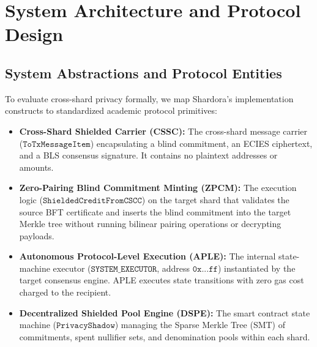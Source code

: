 \documentclass[journal,10pt,twocolumn]{IEEEtran}
\theoremstyle{definition}
\theoremstyle{remark}
\begin{document}
\section{System Architecture and Protocol Design}

\subsection{System Abstractions and Protocol Entities}
To evaluate cross-shard privacy formally, we map Shardora's implementation constructs to standardized academic protocol primitives:
\begin{itemize}[leftmargin=*]
    \item \textbf{Cross-Shard Shielded Carrier (CSSC):} The cross-shard message carrier ($\mathtt{ToTxMessageItem}$) encapsulating a blind commitment, an ECIES ciphertext, and a BLS consensus signature. It contains no plaintext addresses or amounts.
    \item \textbf{Zero-Pairing Blind Commitment Minting (ZPCM):} The execution logic ($\mathtt{ShieldedCreditFromCSCC}$) on the target shard that validates the source BFT certificate and inserts the blind commitment into the target Merkle tree without running bilinear pairing operations or decrypting payloads.
    \item \textbf{Autonomous Protocol-Level Execution (APLE):} The internal state-machine executor ($\mathtt{SYSTEM\_EXECUTOR}$, address $\mathtt{0x...ff}$) instantiated by the target consensus engine. APLE executes state transitions with zero gas cost charged to the recipient.
    \item \textbf{Decentralized Shielded Pool Engine (DSPE):} The smart contract state machine ($\mathtt{PrivacyShadow}$) managing the Sparse Merkle Tree (SMT) of commitments, spent nullifier sets, and denomination pools within each shard.
\end{itemize}
\end{document}
